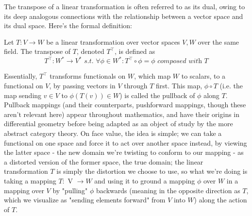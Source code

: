 \documentclass{article}
\newcommand{\n}{\leavevmode \newline}
\newcommand{\nn}{\leavevmode \newline \newline}
\newcommand{\sti}{\textit{ s.t. }}
\begin{document}
\nn
The transpose of a linear transformation is often referred to as its dual, owing to its deep analogous connections with the relationship between a vector space and its dual space. Here's the formal definition:
\n
\begin{adjustwidth}{1cm}{1cm}

    Let $ T: V \rightarrow W $ be a linear transformation over vector spaces $ V, W $ over the same field. The transpose of $ T $, denoted $ T^\intercal $, is defined as
        $$ T^\intercal: W^* \rightarrow V^* \sti \forall \phi \in W^*: T^\intercal \circ \phi = \phi \textit{ composed with } T $$

\end{adjustwidth}
\n
Essentially, $ T^\intercal $ transforms functionals on $ W $, which map $ W $ to scalars, to a functional on $ V $, by passing vectors in $ V $ through $ T $ first. This map, $ \phi \circ T $ (i.e. the map sending $ v \in V $ to $ \phi(T(v)) \in W $) is called the pullback of $ \phi $ along $ T $. Pullback mappings (and their counterparts, pushforward mappings, though these aren't relevant here) appear throughout mathematics, and have their origins in differential geometry before being adapted as an object of study by the more abstract category theory. On face value, the idea is simple; we can take a functional on one space and force it to act over another space instead, by viewing the latter space - the new domain we're twisting to conform to our mapping - as a distorted version of the former space, the true domain; the linear transformation $ T $ is simply the distortion we choose to use, so what we're doing is taking a mapping $ T: $ V $ \rightarrow W $ and using it to ground a mapping $ \phi $ over $ W $ in a mapping over $ V $ by "pulling" $ \phi $ backwards (meaning in the opposite direction as $ T $, which we visualize as "sending elements forward" from $ V $ into $ W $) along the action of $ T $.
\nn
\end{document}
